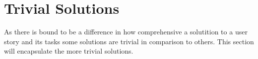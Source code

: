 \section{Trivial Solutions}
As there is bound to be a difference in how comprehensive a solutition to a user story and its tasks some solutions are trivial in comparison to others.
This section will encapsulate the more trivial solutions.

